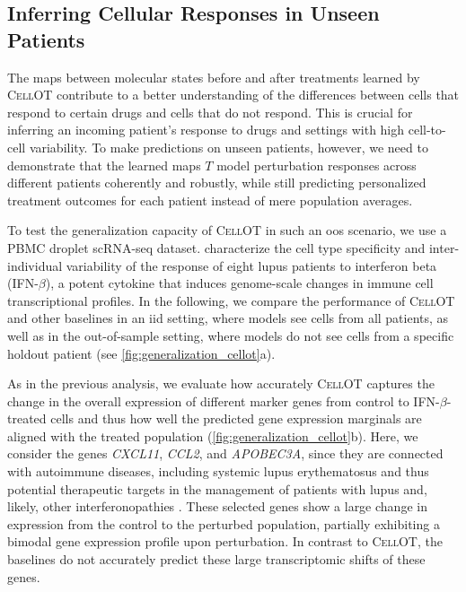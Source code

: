 \subsection{Inferring Cellular Responses in Unseen Patients}
The maps between molecular states before and after treatments learned by \textsc{CellOT} contribute to a better understanding of the differences between cells that respond to certain drugs and cells that do not respond. This is crucial for inferring an incoming patient's response to drugs and settings with high cell-to-cell variability.
To make predictions on unseen patients, however, we need to demonstrate that the learned maps $T$ model perturbation responses across different patients coherently and robustly, while still predicting personalized treatment outcomes for each patient instead of mere population averages.

To test the generalization capacity of \textsc{CellOT} in such an \acrfull{oos} scenario, we use a \acrfull{PBMC} droplet scRNA-seq dataset. \citet{kang2018multiplexed} characterize the cell type specificity and inter-individual variability of the response of eight lupus patients to interferon beta (IFN-$\beta$), a potent cytokine that induces genome-scale changes in immune cell transcriptional profiles. 
In the following, we compare the performance of \textsc{CellOT} and other baselines in an \acrfull{iid} setting, where models see cells from all patients, as well as in the out-of-sample setting, where models do not see cells from a specific holdout patient (see \cref{fig:generalization_cellot}a).
    
As in the previous analysis, we evaluate how accurately \textsc{CellOT} captures the change in the overall expression of different marker genes from control to IFN-$\beta$-treated cells and thus how well the predicted gene expression marginals are aligned with the treated population (\cref{fig:generalization_cellot}b). Here, we consider the genes \textit{CXCL11}, \textit{CCL2}, and \textit{APOBEC3A},
since they are connected with autoimmune diseases, including systemic lupus erythematosus \citep{hedrich2011epigenetic, perez2021sustained}
and thus potential therapeutic targets
in the management of patients with lupus and, likely, other interferonopathies \citep{mathian2015targeting,rani1996characterization,hedrich2011epigenetic,mathian2015targeting,perez2021sustained,flier2001differential}.
These selected genes show a large change in expression from the control to the perturbed population, partially exhibiting a bimodal gene expression profile upon perturbation. In contrast to \textsc{CellOT}, the baselines do not accurately predict these large transcriptomic shifts of these genes.

